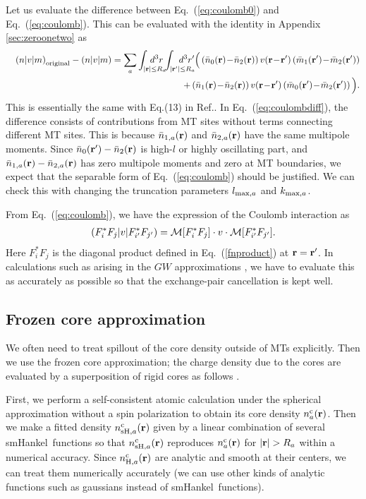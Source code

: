 \documentclass[a4paper,10pt,aip,onecolumn,amsmath,amssymb,floatfix,rmp]{revtex4-1}
\newcommand{\bfr}{{\bf r}}
\newcommand{\req}[1]{\mbox{Eq.~\!(\ref{#1})}}
\def\smh{smHankel}
\def\nc{n^{\rm c}}
\def\MM{{\cal M}}
\def\inta{\int_{|\bfr|\leq R_a}\!\!\!\!\!\!\!\!\!\!\!\!}
\def\intad{\int_{|\bfr'|\leq R_a}\!\!\!\!\!\!\!\!\!\!\!\!}
\begin{document}
\begin{widetext}
\begin{widetext}
Let us evaluate the difference between \req{eq:coulomb0} and \req{eq:coulomb}.
This can be evaluated with the identity in Appendix \ref{sec:zeroonetwo} as
\begin{eqnarray}
&&\left(n|v|m\right)_{\rm original}-\left(n|v|m\right)= 
\sum_a \inta d^3r \intad d^3r'\Big(
\left( \bar{n}_0(\bfr) \!-\! \bar{n}_2(\bfr) \right) 
v(\bfr\!-\!\bfr') \left( \bar{m}_1(\bfr')\!-\!\bar{m}_2(\bfr') \right)  \nonumber \\
&&+\left( \bar{n}_1(\bfr)\!-\!\bar{n}_2(\bfr) \right) 
v(\bfr\!-\!\bfr') \left( \bar{m}_0(\bfr')\!-\!\bar{m}_2(\bfr') \right)\Big).
\label{eq:coulombdiff}
\end{eqnarray}
This is essentially the same with Eq.(13) in Ref.\cite{kresse99}.  In
\req{eq:coulombdiff}, the difference consists of contributions from MT
sites without terms connecting different MT sites. This is because
$\bar{n}_{1,a}(\bfr)$ and $\bar{n}_{2,a}(\bfr)$ have the same multipole
moments.  Since $\bar{n}_0(\bfr') - \bar{n}_2(\bfr)$ is high-$l$ or
highly oscillating part, and $\bar{n}_{1,a}(\bfr)-\bar{n}_{2,a}(\bfr)$
has zero multipole moments and zero at MT boundaries, we expect that the
separable form of \req{eq:coulomb} should be justified. We can check
this with changing the truncation parameters $l_{{\rm max},a}$ and 
$k_{{\rm max},a}$.

From \req{eq:coulomb}, we have the expression of the Coulomb
interaction as
\begin{eqnarray}
\left(F^*_i F_j|v|F^*_{i'}F_{j'}\right) = \MM[F^*_iF_j] \cdot v \cdot \MM[F^*_{i'}F_{j'}].
\label{eq:ffvff}
\end{eqnarray}
Here $F^*_i F_j$ is the diagonal product defined in \req{fnproduct} at
$\bfr=\bfr'$.  In calculations such as arising in the $GW$
approximations \cite{kotani07a}, we have to evaluate this as accurately
as possible so that the exchange-pair cancellation is kept well.


\subsection{Frozen core approximation}
\label{sec:frozencore} We often need to treat spillout of the core
density outside of MTs explicitly. Then we use the frozen core
approximation; the charge density due to the cores are evaluated by a
superposition of rigid cores as follows \cite{lmfchap}.

First, we perform a self-consistent atomic calculation under the
spherical approximation without a spin polarization to obtain its core
density $\nc_a(\bfr)$. Then we make a fitted density $\nc_{{\rm
sH},a}(\bfr)$ given by a linear combination of several \smh\ functions
so that $\nc_{{\rm sH},a}(\bfr)$ reproduces $\nc_{a}(\bfr)$ for
$|\bfr|>R_a$ within a numerical accuracy. Since $\nc_{{\rm H},a}(\bfr)$
are analytic and smooth at their centers, we can treat them numerically
accurately (we can use other kinds of analytic functions such as
gaussians instead of \smh\ functions).


\end{widetext}
\end{widetext}
\end{document}

